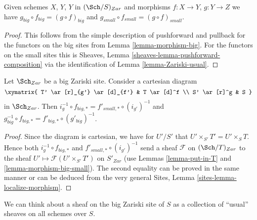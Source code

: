 \begin{lemma}
\label{lemma-composition}
Given schemes $X$, $Y$, $Y$ in $(\Sch/S)_{Zar}$
and morphisms $f : X \to Y$, $g : Y \to Z$ we have
$g_{big} \circ f_{big} = (g \circ f)_{big}$ and
$g_{small} \circ f_{small} = (g \circ f)_{small}$.
\end{lemma}

\begin{proof}
This follows from the simple description of pushforward
and pullback for the functors on the big sites from
Lemma \ref{lemma-morphism-big}. For the functors
on the small sites this is
Sheaves, Lemma \ref{sheaves-lemma-pushforward-composition}
via the identification of Lemma \ref{lemma-Zariski-usual}.
\end{proof}

\begin{lemma}
\label{lemma-morphism-big-small-cartesian-diagram}
Let $\Sch_{Zar}$ be a big Zariski site. Consider a cartesian diagram
$$
\xymatrix{
T' \ar[r]_{g'} \ar[d]_{f'} & T \ar[d]^f \\
S' \ar[r]^g & S
}
$$
in $\Sch_{Zar}$. Then
$i_g^{-1} \circ f_{big, *} = f'_{small, *} \circ (i_{g'})^{-1}$
and $g_{big}^{-1} \circ f_{big, *} = f'_{big, *} \circ (g'_{big})^{-1}$.
\end{lemma}

\begin{proof}
Since the diagram is cartesian, we have for $U'/S'$
that $U' \times_{S'} T' = U' \times_S T$. Hence both
$i_g^{-1} \circ f_{big, *}$ and $f'_{small, *} \circ (i_{g'})^{-1}$
send a sheaf $\mathcal{F}$ on $(\Sch/T)_{Zar}$ to the sheaf
$U' \mapsto \mathcal{F}(U' \times_{S'} T')$ on $S'_{Zar}$
(use Lemmas \ref{lemma-put-in-T} and \ref{lemma-morphism-big-small}).
The second equality can be proved in the same manner or can be
deduced from the very general
Sites, Lemma \ref{sites-lemma-localize-morphism}.
\end{proof}

\noindent
We can think about a sheaf on the big Zariski site of $S$ as a collection
of ``usual'' sheaves on all schemes over $S$.

